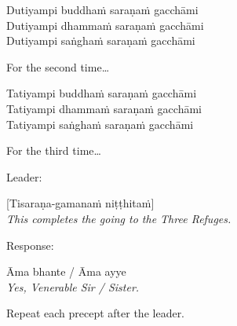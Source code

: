 Dutiyampi buddhaṁ saraṇaṁ gacchāmi\\
Dutiyampi dhammaṁ saraṇaṁ gacchāmi\\
Dutiyampi saṅghaṁ saraṇaṁ gacchāmi

\begin{english}
  For the second time\ldots
\end{english}

Tatiyampi buddhaṁ saraṇaṁ gacchāmi\\
Tatiyampi dhammaṁ saraṇaṁ gacchāmi\\
Tatiyampi saṅghaṁ saraṇaṁ gacchāmi

\begin{english}
  For the third time\ldots
\end{english}

\begin{instruction}
  Leader:
\end{instruction}

[Tisaraṇa-gamanaṁ niṭṭhitaṁ]\\
\emph{This completes the going to the Three Refuges.}

\begin{instruction}
  Response:
\end{instruction}

Āma bhante / Āma ayye\\
\emph{Yes, Venerable Sir / Sister.}

\begin{instruction}
  Repeat each precept after the leader.
\end{instruction}

\ifhandbookedition
\enlargethispage{-\baselineskip}
\fi

